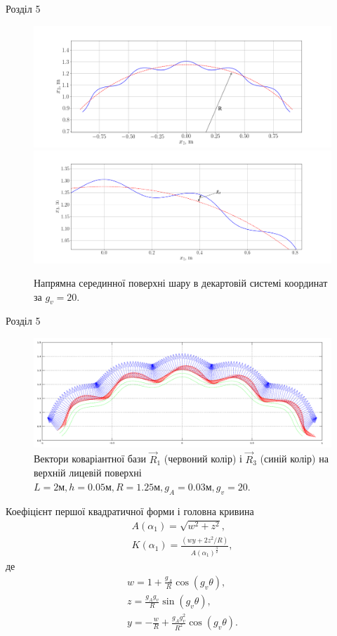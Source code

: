 \documentclass[8pt]{beamer}
\numberwithin{figure}{section}
\numberwithin{equation}{section}
\numberwithin{table}{section}
\begin{document}
\begin{frame}{Розділ 5}

\begin{figure}
	\includegraphics[width=0.8\linewidth]{pic/cor_geomR.png}\\
	\includegraphics[width=0.8\linewidth]{pic/cor_geom_zoomedR.png}
		\caption{Напрямна серединної поверхні шару в декартовій системі координат за $g_v=20$.}
		\label{fig:omage_K_h}
\end{figure}



\end{frame}

\begin{frame}{Розділ 5}
\begin{figure}
	\includegraphics[scale=0.2]{pic/cor_R1R32.png}
		\caption{Вектори коваріантної бази $\vec{R}_1$ (червоний колір) і $\vec{R}_3$ (синій колір) на верхній лицевій поверхні $L=2\text{м}, h=0.05\text{м},R=1.25\text{м},g_A=0.03\text{м}, g_v=20$.}
\end{figure}

Коефіцієнт першої квадратичної форми і головна кривина
\begin{gather}
A\left(\alpha_1\right) = \sqrt{w^2+z^2},\\
K\left(\alpha_1\right) = \frac{\left(wy+2z^2/R\right)}{A\left(\alpha_1\right)^{\frac{3}{2}}},
\end{gather}
де
\begin{gather*}
w=1+\frac{g_A}{R}\cos\left(g_v\theta\right),\\
z=\frac{g_A g_v}{R}\sin\left(g_v\theta\right),\\
y=-\frac{w}{R}+\frac{g_A g_v^2}{R^2}\cos\left(g_v\theta\right).
\end{gather*}


\end{frame}
\end{document}
